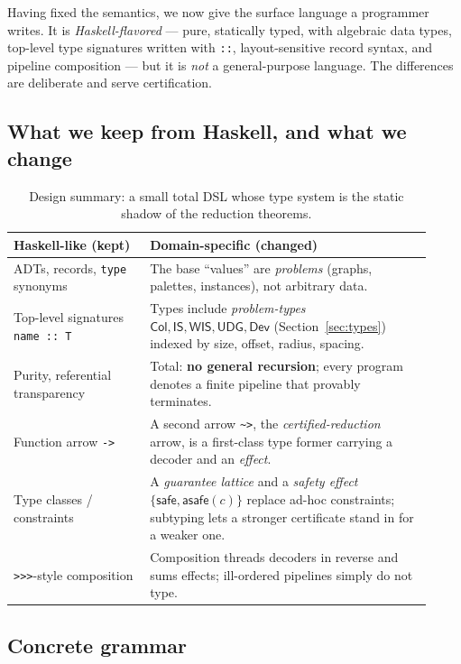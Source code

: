 \documentclass[11pt]{article}
\theoremstyle{definition}
\theoremstyle{remark}
\newcommand{\Col}{\mathsf{Col}}
\newcommand{\ISt}{\mathsf{IS}}
\newcommand{\WIS}{\mathsf{WIS}}
\newcommand{\tUDG}{\mathsf{UDG}}
\newcommand{\Dev}{\mathsf{Dev}}
\newcommand{\safe}{\textsf{safe}}
\newcommand{\asafe}[1]{\textsf{asafe}(#1)}
\begin{document}
Having fixed the semantics, we now give the surface language a programmer writes. It is
\emph{Haskell-flavored} --- pure, statically typed, with algebraic data types,
top-level type signatures written with \texttt{::}, layout-sensitive record syntax, and
pipeline composition --- but it is \emph{not} a general-purpose language. The
differences are deliberate and serve certification.

\subsection{What we keep from Haskell, and what we change}
\label{sec:langdesign}

\begin{table}[h]
\centering
\renewcommand{\arraystretch}{1.2}
\begin{tabular}{@{}p{0.30\linewidth}p{0.62\linewidth}@{}}
\toprule
Haskell-like (kept) & Domain-specific (changed) \\
\midrule
ADTs, records, \texttt{type} synonyms & The base ``values'' are \emph{problems} (graphs,
palettes, instances), not arbitrary data. \\
Top-level signatures \texttt{name :: T} & Types include \emph{problem-types}
$\Col,\ISt,\WIS,\tUDG,\Dev$ (Section~\ref{sec:types}) indexed by size, offset, radius,
spacing. \\
Purity, referential transparency & Total: \textbf{no general recursion}; every program
denotes a finite pipeline that provably terminates. \\
Function arrow \texttt{->} & A second arrow \texttt{\~{}>}, the \emph{certified-reduction}
arrow, is a first-class type former carrying a decoder and an \emph{effect}. \\
Type classes / constraints & A \emph{guarantee lattice} and a \emph{safety effect}
$\{\safe,\asafe{c}\}$ replace ad-hoc constraints; subtyping lets a stronger certificate
stand in for a weaker one. \\
\texttt{>>>}-style composition & Composition threads decoders in reverse and sums
effects; ill-ordered pipelines simply do not type. \\
\bottomrule
\end{tabular}
\caption{Design summary: a small total DSL whose type system is the static shadow of the
reduction theorems.}
\label{tab:langdesign}
\end{table}

\subsection{Concrete grammar}
\label{sec:grammar}
\end{document}
